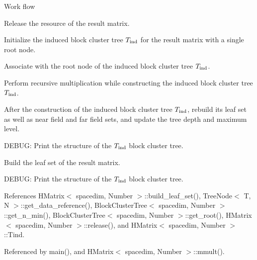 \begin{DoxyDescription}
\item[Work flow ]


\begin{DoxyItemize}
\item Release the resource of the result matrix.


\item Initialize the induced block cluster tree $T_{\rm ind}$ for the result matrix with a single root node.


\item Associate with the root node of the induced block cluster tree $T_{\rm ind}$.


\item Perform recursive multiplication while constructing the induced block cluster tree $T_{\rm ind}$.


\item After the construction of the induced block cluster tree $T_{\rm ind}$, rebuild its leaf set as well as near field and far field sets, and update the tree depth and maximum level.

D\+E\+B\+UG\+: Print the structure of the $T_{\rm ind}$ block cluster tree.


\item Build the leaf set of the result matrix.

D\+E\+B\+UG\+: Print the structure of the $T_{\rm ind}$ block cluster tree.


\end{DoxyItemize}
\end{DoxyDescription}

References H\+Matrix$<$ spacedim, Number $>$\+::build\+\_\+leaf\+\_\+set(), Tree\+Node$<$ T, N $>$\+::get\+\_\+data\+\_\+reference(), Block\+Cluster\+Tree$<$ spacedim, Number $>$\+::get\+\_\+n\+\_\+min(), Block\+Cluster\+Tree$<$ spacedim, Number $>$\+::get\+\_\+root(), H\+Matrix$<$ spacedim, Number $>$\+::release(), and H\+Matrix$<$ spacedim, Number $>$\+::\+Tind.



Referenced by main(), and H\+Matrix$<$ spacedim, Number $>$\+::mmult().

\mbox{\label{classHMatrix_a4139e9069e3b18d4719c527ce2e0414c}} 
